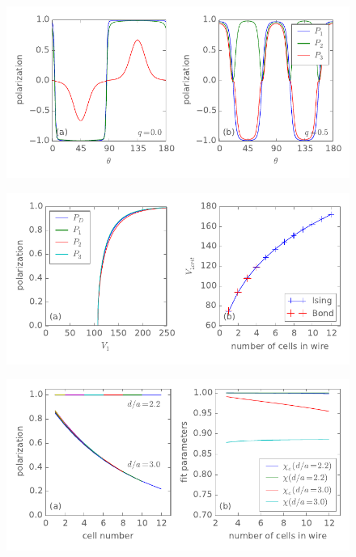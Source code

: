 %
\begin{figure}
  \center
  \includegraphics{three_cells_P_over_theta}
  \caption{
  }
  \label{fig:three_cells_P_over_theta}
\end{figure}
%

%
\begin{figure}
  \center
  \includegraphics{critical_V1}
  \caption{
  }
  \label{fig:critical_V1}
\end{figure}
%

%
\begin{figure}
  \center
  \includegraphics{wire_polarization}
  \caption{
  }
  \label{fig:wire_polarization}
\end{figure}
%
